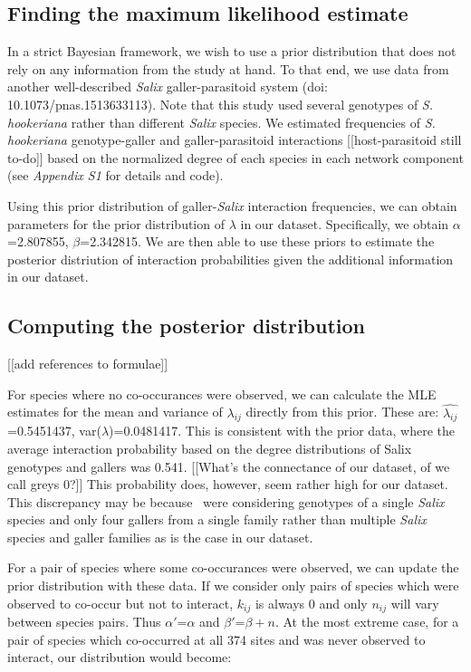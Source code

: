 \documentclass[12pt]{article}
\begin{document}
  \subsection*{Finding the maximum likelihood estimate}

      In a strict Bayesian framework, we wish to use a prior distribution that does not rely on any information from the study at hand. To that end, we use data from another well-described \emph{Salix} galler-parasitoid system (doi: 10.1073/pnas.1513633113). Note that this study used several genotypes of \emph{S. hookeriana} rather than different \emph{Salix} species. We estimated frequencies of  \emph{S. hookeriana} genotype-galler and galler-parasitoid interactions [[host-parasitoid still to-do]] based on the normalized degree of each species in each network component (see \emph{Appendix S1} for details and code).


      Using this prior distribution of galler-\emph{Salix} interaction frequencies, we can obtain parameters for the prior distribution of $\lambda$ in our dataset. Specifically, we obtain $\alpha$=2.807855, $\beta$=2.342815. We are then able to use these priors to estimate the posterior distriution of interaction probabilities given the additional information in our dataset.


    \subsection*{Computing the posterior distribution}

      [[add references to formulae]]

      For species where no co-occurances were observed, we can calculate the MLE estimates for the mean and variance of $\lambda_{ij}$ directly from this prior. These are:
      $\hat{\lambda_{ij}}$=0.5451437, var($\lambda$)=0.0481417.
      This is consistent with the prior data, where the average interaction probability based on the degree distributions of Salix genotypes and gallers was 0.541. [[What's the connectance of our dataset, of we call greys 0?]] This probability does, however, seem rather high for our dataset. This discrepancy may be because~\citep{Balbour2016} were considering genotypes of a single \emph{Salix} species and only four gallers from a single family rather than multiple \emph{Salix} species and galler families as is the case in our dataset.


      For a pair of species where some co-occurances were observed, we can update the prior distribution with these data. If we consider only pairs of species which were observed to co-occur but not to interact, $k_{ij}$ is always 0 and only $n_{ij}$ will vary between species pairs. Thus $\alpha'$=$\alpha$ and $\beta'$=$\beta + n$. At the most extreme case, for a pair of species which co-occurred at all 374 sites and was never observed to interact, our distribution would become:
\end{document}
